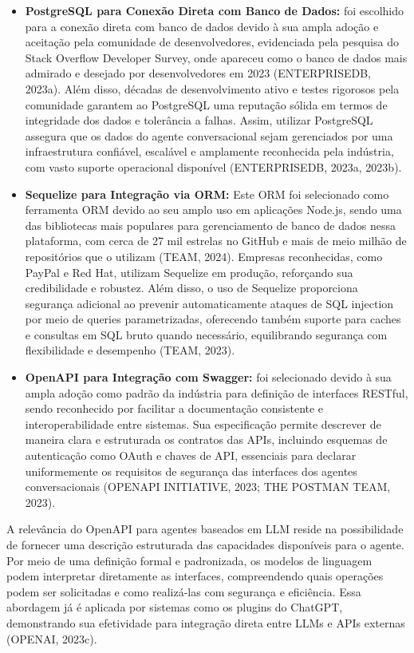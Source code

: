 \documentclass[
]{article}
\begin{document}
\begin{itemize}
\item
  \textbf{PostgreSQL para Conexão Direta com Banco de Dados:} foi
  escolhido para a conexão direta com banco de dados devido à sua ampla
  adoção e aceitação pela comunidade de desenvolvedores, evidenciada
  pela pesquisa do Stack Overflow Developer Survey, onde apareceu como o
  banco de dados mais admirado e desejado por desenvolvedores em 2023
  (ENTERPRISEDB, 2023a). Além disso, décadas de desenvolvimento ativo e
  testes rigorosos pela comunidade garantem ao PostgreSQL uma reputação
  sólida em termos de integridade dos dados e tolerância a falhas.
  Assim, utilizar PostgreSQL assegura que os dados do agente
  conversacional sejam gerenciados por uma infraestrutura confiável,
  escalável e amplamente reconhecida pela indústria, com vasto suporte
  operacional disponível (ENTERPRISEDB, 2023a, 2023b).
\item
  \textbf{Sequelize para Integração via ORM:} Este ORM foi selecionado
  como ferramenta ORM devido ao seu amplo uso em aplicações Node.js,
  sendo uma das bibliotecas mais populares para gerenciamento de banco
  de dados nessa plataforma, com cerca de 27 mil estrelas no GitHub e
  mais de meio milhão de repositórios que o utilizam (TEAM, 2024).
  Empresas reconhecidas, como PayPal e Red Hat, utilizam Sequelize em
  produção, reforçando sua credibilidade e robustez. Além disso, o uso
  de Sequelize proporciona segurança adicional ao prevenir
  automaticamente ataques de SQL injection por meio de queries
  parametrizadas, oferecendo também suporte para caches e consultas em
  SQL bruto quando necessário, equilibrando segurança com flexibilidade
  e desempenho (TEAM, 2023).
\item
  \textbf{OpenAPI para Integração com Swagger:} foi selecionado devido à
  sua ampla adoção como padrão da indústria para definição de interfaces
  RESTful, sendo reconhecido por facilitar a documentação consistente e
  interoperabilidade entre sistemas. Sua especificação permite descrever
  de maneira clara e estruturada os contratos das APIs, incluindo
  esquemas de autenticação como OAuth e chaves de API, essenciais para
  declarar uniformemente os requisitos de segurança das interfaces dos
  agentes conversacionais (OPENAPI INITIATIVE, 2023; THE POSTMAN TEAM,
  2023).
\end{itemize}

A relevância do OpenAPI para agentes baseados em LLM reside na
possibilidade de fornecer uma descrição estruturada das capacidades
disponíveis para o agente. Por meio de uma definição formal e
padronizada, os modelos de linguagem podem interpretar diretamente as
interfaces, compreendendo quais operações podem ser solicitadas e como
realizá-las com segurança e eficiência. Essa abordagem já é aplicada por
sistemas como os plugins do ChatGPT, demonstrando sua efetividade para
integração direta entre LLMs e APIs externas (OPENAI, 2023c).
\end{document}
